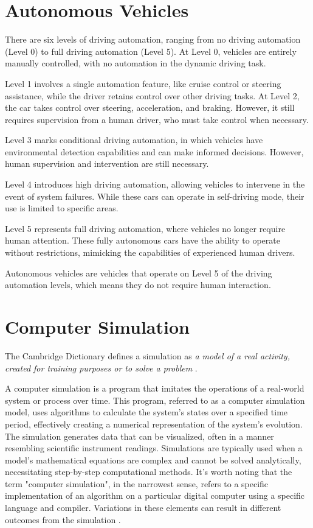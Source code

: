 \section{Autonomous Vehicles}
There are six levels of driving automation, ranging from no driving automation (Level 0) to full driving automation (Level 5). At Level 0, vehicles are entirely manually controlled, with no automation in the dynamic driving task. 

Level 1 involves a single automation feature, like cruise control or steering assistance, while the driver retains control over other driving tasks. At Level 2, the car takes control over steering, acceleration, and braking. However, it still requires supervision from a human driver, who must take control when necessary.

Level 3 marks conditional driving automation, in which vehicles have environmental detection capabilities and can make informed decisions. However, human supervision and intervention are still necessary.

Level 4 introduces high driving automation, allowing vehicles to intervene in the event of system failures. While these cars can operate in self-driving mode, their use is limited to specific areas.

Level 5 represents full driving automation, where vehicles no longer require human attention. These fully autonomous cars have the ability to operate without restrictions, mimicking the capabilities of experienced human drivers.

Autonomous vehicles are vehicles that operate on Level 5 of the driving automation levels, which means they do not require human interaction\cite{Synopsys}\cite{SAEMobilus}\cite{TWI}.



\section{Computer Simulation}
The Cambridge Dictionary defines a simulation as \textit{a model of a real activity, created for training purposes or to solve a problem} \cite{CambridgeSim}.

A computer simulation is a program that imitates the operations of a real-world system or process over time. This program, referred to as a computer simulation model, uses algorithms to calculate the system's states over a specified time period, effectively creating a numerical representation of the system's evolution. The simulation generates data that can be visualized, often in a manner resembling scientific instrument readings. Simulations are typically used when a model's mathematical equations are complex and cannot be solved analytically, necessitating step-by-step computational methods. It's worth noting that the term "computer simulation", in the narrowest sense, refers to a specific implementation of an algorithm on a particular digital computer using a specific language and compiler. Variations in these elements can result in different outcomes from the simulation \cite{Winsberg}.

